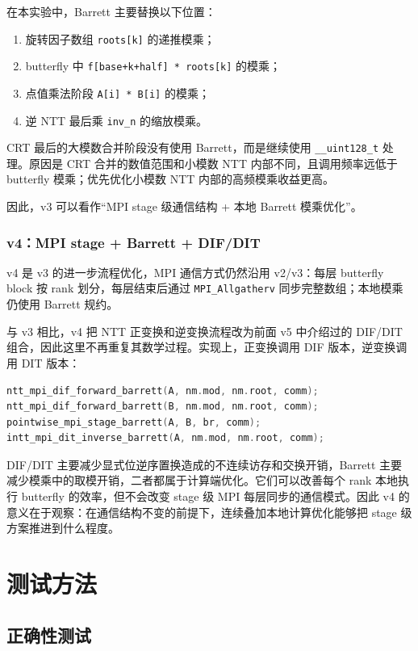 \documentclass[a4paper]{article}
\begin{document}
在本实验中，Barrett 主要替换以下位置：
\begin{enumerate}
    \item 旋转因子数组 \texttt{roots[k]} 的递推模乘；
    \item butterfly 中 \texttt{f[base+k+half] * roots[k]} 的模乘；
    \item 点值乘法阶段 \texttt{A[i] * B[i]} 的模乘；
    \item 逆 NTT 最后乘 \texttt{inv\_n} 的缩放模乘。
\end{enumerate}

CRT 最后的大模数合并阶段没有使用 Barrett，而是继续使用 \texttt{\_\_uint128\_t} 处理。原因是 CRT 合并的数值范围和小模数 NTT 内部不同，且调用频率远低于 butterfly 模乘；优先优化小模数 NTT 内部的高频模乘收益更高。

因此，v3 可以看作“MPI stage 级通信结构 + 本地 Barrett 模乘优化”。

\subsubsection{v4：MPI stage + Barrett + DIF/DIT}

v4 是 v3 的进一步流程优化，MPI 通信方式仍然沿用 v2/v3：每层 butterfly block 按 rank 划分，每层结束后通过 \texttt{MPI\_Allgatherv} 同步完整数组；本地模乘仍使用 Barrett 规约。

与 v3 相比，v4 把 NTT 正变换和逆变换流程改为前面 v5 中介绍过的 DIF/DIT 组合，因此这里不再重复其数学过程。实现上，正变换调用 DIF 版本，逆变换调用 DIT 版本：
\begin{lstlisting}[language=C++,title=v4 的 stage + Barrett + DIF/DIT 主流程]
ntt_mpi_dif_forward_barrett(A, nm.mod, nm.root, comm);
ntt_mpi_dif_forward_barrett(B, nm.mod, nm.root, comm);
pointwise_mpi_stage_barrett(A, B, br, comm);
intt_mpi_dit_inverse_barrett(A, nm.mod, nm.root, comm);
\end{lstlisting}

DIF/DIT 主要减少显式位逆序置换造成的不连续访存和交换开销，Barrett 主要减少模乘中的取模开销，二者都属于计算端优化。它们可以改善每个 rank 本地执行 butterfly 的效率，但不会改变 stage 级 MPI 每层同步的通信模式。因此 v4 的意义在于观察：在通信结构不变的前提下，连续叠加本地计算优化能够把 stage 级方案推进到什么程度。

\section{测试方法}

\subsection{正确性测试}
\end{document}
